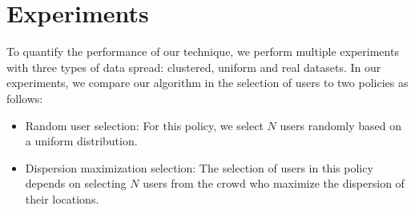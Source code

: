 \documentclass{acm_proc_article-sp}
\begin{document}
\section{Experiments}
To quantify the performance of our technique, we perform multiple experiments with three types of data spread: clustered, uniform and real datasets. In our experiments, we compare our algorithm in the selection of users to two policies as follows:
\begin{itemize}
\item Random user selection: For this policy, we select $N$ users randomly based on a uniform distribution.
\item Dispersion maximization selection: The selection of users in this policy depends on selecting $N$ users from the crowd who maximize the dispersion of their locations.
\end{itemize}
\end{document}
